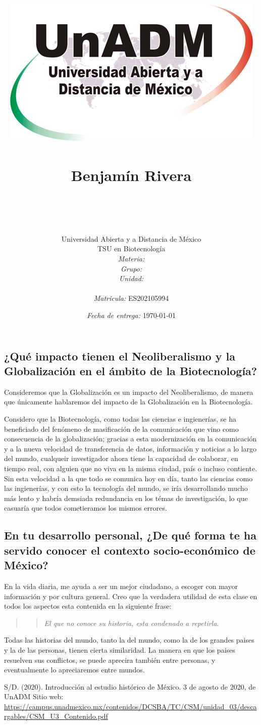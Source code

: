 \documentclass[12pt]{article}
\title{
	\includegraphics{../../../assets/logo-unadm} \\
	\ \\ Benjam\'in Rivera \\
	\bf{\titulo}\\\ \\}
\author{
	Universidad Abierta y a Distancia de México \\
	TSU en Biotecnolog\'ia \\
	\textit{Materia:} \materia \\
	\textit{Grupo:} \grupo \\
	\textit{Unidad:} \unidad \\
	\\
	\textit{Matricula:} ES202105994 }
\date{\textit{Fecha de entrega:} \today}
\begin{document}
\maketitle\newpage

\subsection*{¿Qué impacto tienen el Neoliberalismo y la Globalización en el ámbito de la Biotecnología?}

	\par Consideremos que la Globalización es un impacto del Neoliberalismo, de manera que únicamente hablaremos del impacto de la Globalización en la Biotecnología.

	\par Considero que la Biotecnología, como todas las ciencias e ingienerías, se ha beneficiado del fenómeno de masificación de la comunicación que vino como consecuencia de la globalización; gracias a esta modernización en la comunicación y a la nueva velocidad de transferencia de datos, información y noticias a lo largo del mundo, cualqueir investigador ahora tiene la capacidad de colaborar, en tiempo real, con alguien que no viva en la misma ciudad, país o incluso contiente. Sin esta velocidad a la que todo se  comunica hoy en día, tanto las ciencias como las ingienerías, y con esto la tecnología del mundo, se iría desarrollando mucho más lento y  habría demsiada redundancia en los témas de investigación, lo que casuaría que todos cometieramos los mismos errores.

\subsection*{En tu desarrollo personal, ¿De qué forma te ha servido conocer el contexto socio-económico de México?}

	\par En la vida diaria, me ayuda a ser un mejor ciudadano, a escoger con mayor información y por cultura general. Creo que la verdadera utilidad de esta clase en todos los aspectos esta contenida en la siguiente frase:
	\begin{quote}\begin{quote}\it
		El que no conoce su historia, esta condenado a repetirla.
	\end{quote}\end{quote}
	
	\par Todas las historias del mundo, tanto la del mundo, como la de los grandes paises y la de las personas, tienen cierta similaridad. La manera en que los paises resuelven sus conflictos, se puede aprecira también entre personas, y eventualmente lo apreciaremos entre mundos.



\begin{thebibliography}{X}
	 S/D. (2020). Introducción al estudio histórico de México. 3 de agosto de 2020, de UnADM Sitio web: \url{https://campus.unadmexico.mx/contenidos/DCSBA/TC/CSM/unidad_03/descargables/CSM_U3_Contenido.pdf}
\end{thebibliography}
\end{document}
